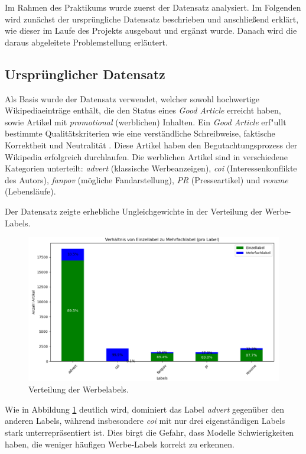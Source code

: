 Im Rahmen des Praktikums wurde zuerst der Datensatz analysiert. Im Folgenden wird zunächst der ursprüngliche Datensatz beschrieben und anschließend erklärt, wie dieser im Laufe des Projekts ausgebaut und ergänzt wurde. Danach wird die daraus abgeleitete Problemstellung erläutert.

\subsection{Ursprünglicher Datensatz}
\label{UrsprunglicherDatensatz}
Als Basis wurde der Datensatz \cite{Urbanbricks2020} verwendet, welcher sowohl hochwertige Wikipediaeinträge enthält, die den Status eines \emph{Good Article} erreicht haben, sowie Artikel mit \textit{promotional} (werblichen) Inhalten. Ein \emph{Good Article} erf"ullt bestimmte Qualitätskriterien wie eine verständliche Schreibweise, faktische Korrektheit und Neutralität \cite{WikiGA}. Diese Artikel haben den Begutachtungsprozess der Wikipedia erfolgreich durchlaufen. Die werblichen Artikel sind in verschiedene Kategorien unterteilt: \emph{advert} (klassische Werbeanzeigen), \emph{coi} (Interessenkonflikte des Autors), \emph{fanpov} (mögliche Fandarstellung), \emph{PR} (Presseartikel) und \emph{resume} (Lebensläufe).

Der Datensatz zeigte erhebliche Ungleichgewichte in der Verteilung der Werbe-Labels.

\begin{figure}[H]
    \centering
    \includegraphics[width=0.7\linewidth]{figures/labelverteilung.png}
    \caption{Verteilung der Werbelabels.}
    \label{fig:labelverteilung}
\end{figure}

Wie in Abbildung \ref{fig:labelverteilung} deutlich wird, dominiert das Label \emph{advert} gegenüber den anderen Labels, während insbesondere \emph{coi} mit nur drei eigenständigen Labels stark unterrepräsentiert ist. Dies birgt die Gefahr, dass Modelle Schwierigkeiten haben, die weniger häufigen Werbe-Labels korrekt zu erkennen.

